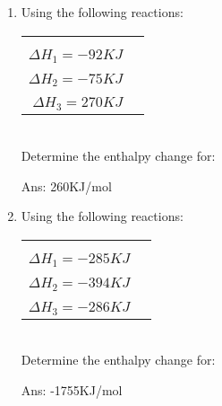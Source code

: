 \documentclass[main.tex]{subfiles}
\begin{document}
\begin{multicols*}{2}
\begin{enumerate}
\item Using the following reactions:\\
\begin{tabularx}{\columnwidth}{>{}m{.65\linewidth} *{2}{Y} }
   \\
   \\
    \\
   \\
    \\
   \\
    \\
\end{tabularx}\\
Determine the enthalpy change for:
\begin{center}\end{center}
\begin{flushright}\small Ans: 260KJ/mol\end{flushright}


\item Using the following reactions:\\
\begin{tabularx}{\columnwidth}{>{}m{.65\linewidth} *{2}{Y} }
   \\
   \\
    \\
   \\
    \\
   \\
    \\
\end{tabularx}\\
Determine the enthalpy change for:
\begin{center}\end{center}
\begin{flushright}\small Ans: -1755KJ/mol\end{flushright}


\end{enumerate}
\end{multicols*}
\end{document}
